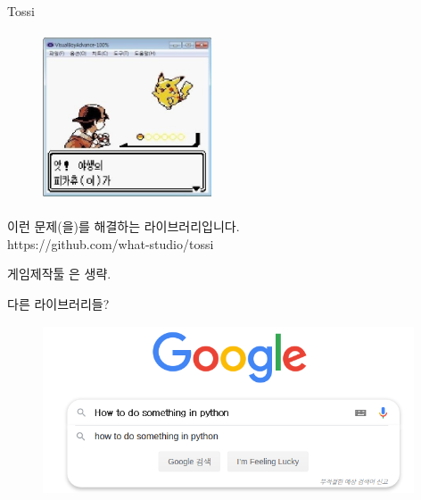 \documentclass{beamer}
\begin{document}
\begin{frame}{Tossi}
\begin{figure}[H]
  \centering
  \includegraphics[width=50mm,height=50mm]{poke.jpg}
\end{figure}
이런 문제(을)를 해결하는 라이브러리입니다.\\
https://github.com/what-studio/tossi
\end{frame}

\begin{frame}{게임제작툴}
은 생략.
\end{frame}

\begin{frame}{다른 라이브러리들?}
\begin{figure}[H]
  \centering
  \includegraphics[width=110mm,height=50mm]{google.png}
\end{figure}
\end{frame}
\end{document}
